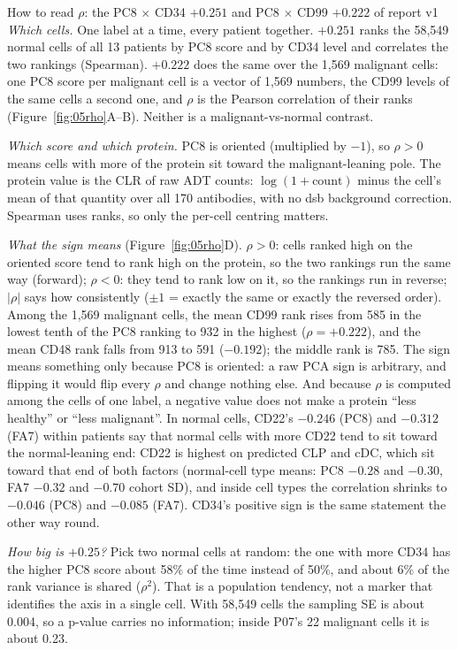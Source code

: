 \begin{explainbox}{How to read $\rho$: the PC8 $\times$ CD34 $+0.251$ and PC8 $\times$ CD99 $+0.222$ of report v1}
\emph{Which cells.} One label at a time, every patient together. $+0.251$ ranks the 58,549 normal cells of all 13 patients by PC8 score and by CD34 level and correlates the two rankings (Spearman). $+0.222$ does the same over the 1,569 malignant cells: one PC8 score per malignant cell is a vector of 1,569 numbers, the CD99 levels of the same cells a second one, and $\rho$ is the Pearson correlation of their ranks (Figure~\ref{fig:05rho}A--B). Neither is a malignant-vs-normal contrast.

\emph{Which score and which protein.} PC8 is oriented (multiplied by $-1$), so $\rho>0$ means cells with more of the protein sit toward the malignant-leaning pole. The protein value is the CLR of raw ADT counts: $\log(1+\text{count})$ minus the cell's mean of that quantity over all 170 antibodies, with no dsb background correction. Spearman uses ranks, so only the per-cell centring matters.

\emph{What the sign means} (Figure~\ref{fig:05rho}D). $\rho > 0$: cells ranked high on the oriented score tend to rank high on the protein, so the two rankings run the same way (forward); $\rho < 0$: they tend to rank low on it, so the rankings run in reverse; $|\rho|$ says how consistently ($\pm 1$ = exactly the same or exactly the reversed order). Among the 1,569 malignant cells, the mean CD99 rank rises from 585 in the lowest tenth of the PC8 ranking to 932 in the highest ($\rho = +0.222$), and the mean CD48 rank falls from 913 to 591 ($-0.192$); the middle rank is 785. The sign means something only because PC8 is oriented: a raw PCA sign is arbitrary, and flipping it would flip every $\rho$ and change nothing else. And because $\rho$ is computed among the cells of one label, a negative value does not make a protein ``less healthy'' or ``less malignant''. In normal cells, CD22's $-0.246$ (PC8) and $-0.312$ (FA7) within patients say that normal cells with more CD22 tend to sit toward the normal-leaning end: CD22 is highest on predicted CLP and cDC, which sit toward that end of both factors (normal-cell type means: PC8 $-0.28$ and $-0.30$, FA7 $-0.32$ and $-0.70$ cohort SD), and inside cell types the correlation shrinks to $-0.046$ (PC8) and $-0.085$ (FA7). CD34's positive sign is the same statement the other way round.

\emph{How big is $+0.25$?} Pick two normal cells at random: the one with more CD34 has the higher PC8 score about 58\% of the time instead of 50\%, and about 6\% of the rank variance is shared ($\rho^2$). That is a population tendency, not a marker that identifies the axis in a single cell. With 58,549 cells the sampling SE is about 0.004, so a p-value carries no information; inside P07's 22 malignant cells it is about 0.23.


\end{explainbox}
